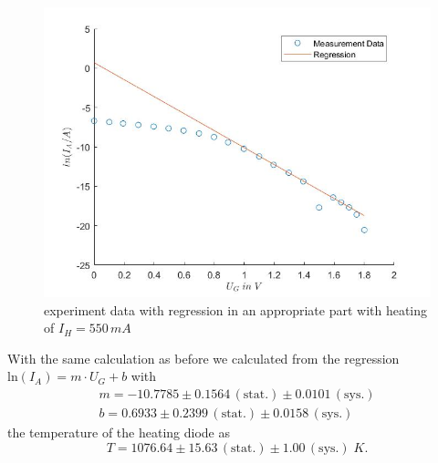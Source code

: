 \documentclass[a4paper, 12pt]{scrartcl}
\begin{document}
\begin{figure}[H]\includegraphics[scale=0.65]{550 Bild}\caption{experiment data with regression in an appropriate part with heating of $I_H=550\,mA$}\end{figure}
With the same calculation as before we calculated from the regression $\text{ln}(I_A)=m\cdot{U_G}+b$ with
\begin{gather*}m=-10.7785\pm0.1564\,(\text{stat.})\pm0.0101\,(\text{sys.})\\b=0.6933\pm0.2399\,(\text{stat.})\pm0.0158\,(\text{sys.})\end{gather*}
the temperature of the heating diode as
\begin{equation*}T=1076.64\pm15.63\,(\text{stat.})\pm1.00\,(\text{sys.})\;K.\end{equation*}
\end{document}
